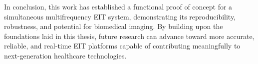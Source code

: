 In conclusion, this work has established a functional proof of concept for a simultaneous multifrequency EIT system, demonstrating its reproducibility, robustness, and potential for biomedical imaging. By building upon the foundations laid in this thesis, future research can advance toward more accurate, reliable, and real-time EIT platforms capable of contributing meaningfully to next-generation healthcare technologies.